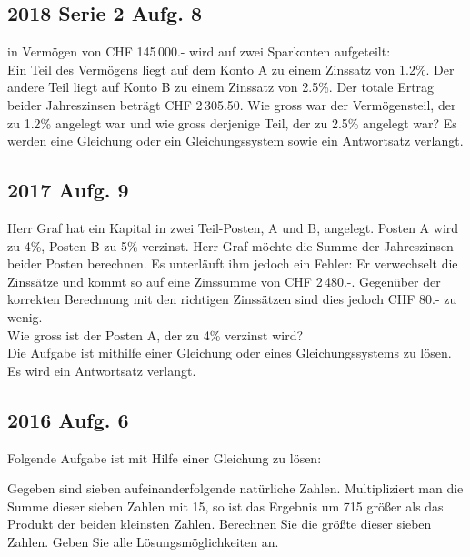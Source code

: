 \subsection{2018 Serie 2 Aufg. 8}
in Vermögen von CHF 145\,000.- wird auf zwei Sparkonten aufgeteilt:\\
Ein Teil des Vermögens liegt auf dem Konto A zu einem Zinssatz von 1.2\%.
Der andere Teil liegt auf Konto B zu einem Zinssatz von 2.5\%.
Der totale Ertrag beider Jahreszinsen beträgt CHF 2\,305.50.
Wie gross war der Vermögensteil, der zu 1.2\% angelegt war und wie gross
derjenige Teil, der zu 2.5\% angelegt war?
Es werden eine Gleichung oder ein Gleichungssystem sowie ein Antwortsatz
verlangt.


\subsection{2017 Aufg. 9}
Herr Graf hat ein Kapital in zwei Teil-Posten, A und B, angelegt. Posten A wird zu 4\%,
Posten B zu 5\% verzinst.
Herr Graf möchte die Summe der Jahreszinsen beider Posten berechnen. Es unterläuft
ihm jedoch ein Fehler: Er verwechselt die Zinssätze und kommt so auf eine Zinssumme
von CHF 2\,480.-. Gegenüber der korrekten Berechnung mit den richtigen Zinssätzen sind
dies jedoch CHF 80.- zu wenig.\\
Wie gross ist der Posten A, der zu 4\% verzinst wird?\\
Die Aufgabe ist mithilfe einer Gleichung oder eines Gleichungssystems zu lösen.\\
Es wird ein Antwortsatz verlangt.

\subsection{2016 Aufg. 6}
Folgende Aufgabe ist mit Hilfe einer Gleichung zu lösen:

Gegeben sind sieben aufeinanderfolgende natürliche Zahlen.
Multipliziert man die Summe dieser sieben Zahlen mit 15, so ist das Ergebnis um 715
größer als das Produkt der beiden kleinsten Zahlen.
Berechnen Sie die größte dieser sieben Zahlen. Geben Sie alle Lösungsmöglichkeiten
an.




